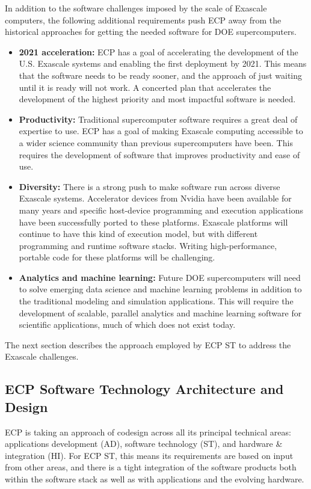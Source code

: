 In addition to the software challenges imposed by the scale of Exascale computers, the following additional requirements push ECP away from the historical approaches for getting the needed software for DOE supercomputers.
\begin{itemize}
\item \textbf{2021 acceleration:} ECP has a goal of accelerating the development of the U.S. Exascale systems and enabling the first deployment by 2021. This means that the software needs to be ready sooner, and the approach of just waiting until it is ready will not work. A concerted plan that accelerates the development of the highest priority and most impactful software is needed.
\item \textbf{Productivity:} Traditional supercomputer software requires a great deal of expertise to use. ECP has a goal of making Exascale computing accessible to a wider science community than previous supercomputers have been. This requires the development of software that improves productivity and ease of use.
\item \textbf{Diversity:} There is a strong push to make software run across diverse Exascale systems. Accelerator devices from Nvidia have been available for many years and specific host-device programming and execution applications have been successfully ported to these platforms.  Exascale platforms will continue to have this kind of execution model, but with different programming and runtime software stacks.  Writing high-performance, portable code for these platforms will be challenging.
\item \textbf{Analytics and machine learning:} Future DOE supercomputers will need to solve emerging data science and machine learning problems in addition to the traditional modeling and simulation applications. This will require the development of scalable, parallel analytics and machine learning software for scientific applications, much of which does not exist today.
\end{itemize}
 
The next section describes the approach employed by ECP ST to address the Exascale challenges.

\subsection{ECP Software Technology Architecture and Design}
ECP is taking an approach of codesign across all its principal technical areas: applications development (AD), software technology (ST), and hardware \& integration (HI). For ECP ST, this means its requirements are based on input from other areas, and there is a tight integration of the software products both within the software stack as well as with applications and the evolving hardware. 

